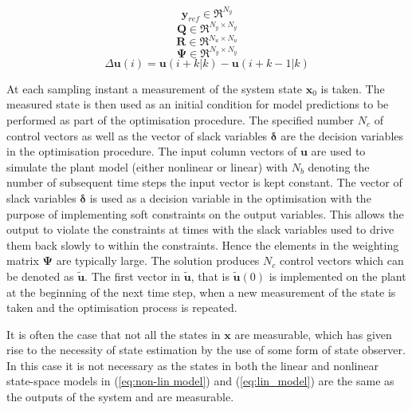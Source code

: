 \documentclass[preprint,authoryear,12pt]{elsarticle}
\begin{document}
\begin{displaymath}
\mathbf{y}_{ref} \in \Re^{N_y}
\end{displaymath}
\begin{displaymath}
\mathbf{Q}\in \Re^{N_y \times N_y}
\end{displaymath}
\begin{displaymath}
\mathbf{R} \in \Re^{N_u \times N_u}
\end{displaymath}
\begin{displaymath}
\boldsymbol{\Psi}\in \Re^{N_y \times N_y}
\end{displaymath}
\begin{displaymath}
\Delta \mathbf{u}(i) = \mathbf{u}(i+k|k) - \mathbf{u}(i+k-1|k)
\end{displaymath}

At each sampling instant a measurement of the system state $\mathbf{x}_0$ is taken. The measured state is then used as an initial condition for model predictions to be performed as part of the optimisation procedure. The specified number $N_c$ of control vectors as well as the vector of slack variables $\boldsymbol{\delta}$ are the decision variables in the optimisation procedure. The input column vectors of $\mathbf{u}$ are used to simulate the plant model (either nonlinear or linear) with $N_b$ denoting the number of subsequent time steps the input vector is kept constant. The vector of slack variables $\boldsymbol{\delta}$ is used as a decision variable in the optimisation with the purpose of implementing soft constraints on the output variables. This allows the output to violate the constraints at times with the slack variables used to drive them back slowly to within the constraints. Hence the elements in the weighting matrix $\boldsymbol{\Psi}$ are typically large. The solution produces $N_c$ control vectors which can be denoted as $\tilde{\mathbf{u}}$. The first vector in $\tilde{\mathbf{u}}$, that is $\tilde{\mathbf{u}}(0)$ is implemented on the plant at the beginning of the next time step, when a new measurement of the state is taken and the optimisation process is repeated.

It is often the case that not all the states in $\mathbf{x}$ are measurable, which has given rise to the necessity of state estimation by the use of some form of state observer. In this case it is not necessary as the states in both the linear and nonlinear state-space models in (\ref{eq:non-lin model}) and (\ref{eq:lin_model}) are the same as the outputs of the system and are measurable. 
\end{document}
